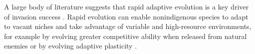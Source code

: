 \documentclass[12pt]{article}\usepackage[]{graphicx}\usepackage[]{color}
\begin{document}
	A large body of literature suggests that rapid adaptive evolution is a key driver of invasion success  \parencite{Sakai2001,Reznick2001, Lambrinos2004,Williamson1997,Thompson1998, Cox2004, Prentis2008,Colautti2015,Lee2002invasion, Fenollosa2019,Clements2011}.  Rapid evolution can enable nonindigenous species to adapt to vacant niches and take advantage of variable and high-resource environments, for example by evolving greater competitive ability  when released from natural enemies \parencite{Blossey1995,Bossdorf2005} or by evolving adaptive plasticity \parencite{Richards2006}. %
	
\end{document}
